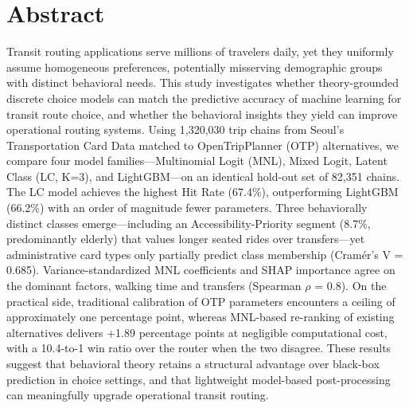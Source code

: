 \documentclass[12pt,a4paper]{article}
\begin{document}



\section{Abstract}

Transit routing applications serve millions of travelers daily, yet they
uniformly assume homogeneous preferences, potentially misserving demographic
groups with distinct behavioral needs. This study investigates whether
theory-grounded discrete choice models can match the predictive accuracy of
machine learning for transit route choice, and whether the behavioral insights
they yield can improve operational routing systems. Using 1,320,030 trip chains
from Seoul's Transportation Card Data matched to OpenTripPlanner (OTP)
alternatives, we compare four model families---Multinomial Logit (MNL), Mixed
Logit, Latent Class (LC, K=3), and LightGBM---on an identical hold-out set of
82,351 chains. The LC model achieves the highest Hit Rate (67.4\%),
outperforming LightGBM (66.2\%) with an order of magnitude fewer parameters.
Three behaviorally distinct classes emerge---including an Accessibility-Priority
segment (8.7\%, predominantly elderly) that values longer seated rides over
transfers---yet administrative card types only partially predict class
membership (Cram\'er's V = 0.685). Variance-standardized MNL coefficients and SHAP importance agree on the
dominant factors, walking time and transfers (Spearman $\rho$ = 0.8). On the
practical side,
traditional calibration of OTP parameters encounters a ceiling of approximately
one percentage point, whereas MNL-based re-ranking of existing alternatives
delivers +1.89 percentage points at negligible computational cost, with a
10.4-to-1 win ratio over the router when the two disagree. These results suggest
that behavioral theory retains a structural advantage over black-box prediction
in choice settings, and that lightweight model-based post-processing can
meaningfully upgrade operational transit routing.
\end{document}
